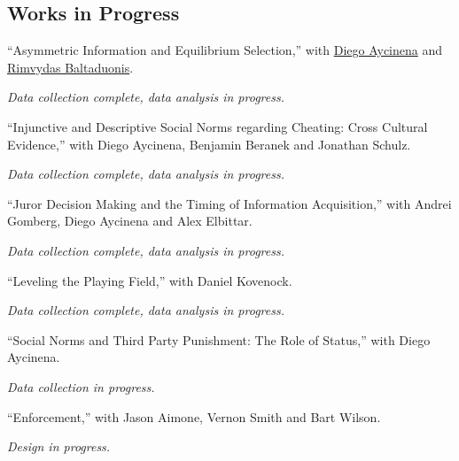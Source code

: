 \documentclass{article}%
\renewenvironment{itemize}{
\begin{list}{}{
\setlength{\leftmargin}{1.5em}
}
}{
\end{list}
}
\begin{document}
\subsection*{Works in Progress}
\begin{itemize}



\item ``Asymmetric Information and Equilibrium Selection,'' with \href{www.diegoaycinena.com}{Diego Aycinena}
and \href{http://public.gettysburg.edu/~rbaltadu/}{Rimvydas Baltaduonis}. 
\begin{itemize}\vspace{-.24cm}
\item \textit{Data collection complete, data analysis in progress.}
\end{itemize}

\item ``Injunctive and Descriptive Social Norms regarding Cheating: Cross Cultural Evidence,'' with Diego Aycinena, Benjamin Beranek and Jonathan Schulz. 
\begin{itemize}\vspace{-.24cm}
\item \textit{Data collection complete, data analysis in progress.}
\end{itemize}

\item ``Juror Decision Making and the Timing of Information Acquisition,'' with Andrei Gomberg, Diego Aycinena and Alex Elbittar. \begin{itemize}\vspace{-.24cm}
\item \textit{Data collection complete, data analysis in progress.}
\end{itemize}

\item ``Leveling the Playing Field,'' with Daniel Kovenock. 
\begin{itemize}\vspace{-.24cm}
\item \textit{Data collection complete, data analysis in progress.}
\end{itemize}


\item ``Social Norms and Third Party Punishment: The Role of Status,'' with Diego Aycinena. 
\begin{itemize}\vspace{-.24cm}
\item \textit{Data collection in progress.}
\end{itemize}


\item ``Enforcement,'' with Jason Aimone, Vernon Smith and Bart Wilson. 
\begin{itemize}\vspace{-.24cm}
\item \textit{Design in progress.}
\end{itemize}

\end{itemize}
\end{document}
